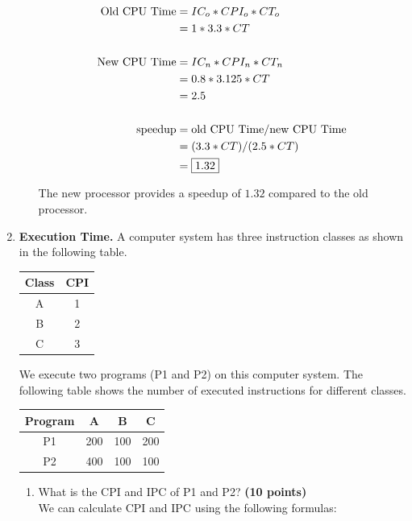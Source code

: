 \documentclass[a4paper, 15pt]{exam}
\begin{document}
\begin{enumerate}
\begin{enumerate}
   	\begin{align*} 
   			\text{Old CPU Time} &= IC_o * CPI_o * CT_o \\
   			&= 1 * 3.3 * CT \\ \\			
   			\text{New CPU Time} &= IC_n * CPI_n * CT_n \\
   			&= 0.8 * 3.125 * CT \\
   			&= 2.5 \\ \\
   			\text{speedup} &= \text{old CPU Time} / \text{new CPU Time} \\
   			&= (3.3 * CT) / (2.5 * CT) \\ 
   			&= \fbox{1.32}
   	\end{align*}
   	
   	The new processor provides a speedup of $1.32$ compared to the old processor.

	\end{enumerate}
	\newpage
    \item \textbf{Execution Time.} A computer system has three instruction classes as shown in the following table.
\begin{center}
\begin{tabular}{ |c|c|} 
 \hline
  
  Class&CPI\\ 
  \hline
 A&1\\ 
 \hline
 B&2\\ 
 \hline
 C&3\\ 
 \hline
\end{tabular}
\end{center}
We execute two programs (P1 and P2) on this computer system. The following table shows the number of executed instructions for different classes.

\begin{center}
\begin{tabular}{ |c|c|c|c|} 
 \hline
  
  Program&A&B&C\\ 
  \hline
 P1&200&100&200\\ 
 \hline
 P2&400&100&100\\ 
 \hline
 
\end{tabular}
\end{center}
\begin{enumerate}
\item What is the CPI and IPC of P1 and P2?
\textbf{(10 points)} \\
We can calculate CPI and IPC using the following formulas:


\end{enumerate}
\end{enumerate}
\end{document}
